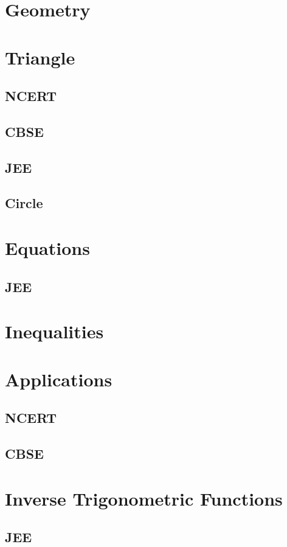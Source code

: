 \documentclass[journal]{IEEEtran}
\begin{document}
\newpage


\tableofcontents

\newpage
\onecolumn


\renewcommand{\thetable}{\theenumi}

\section{Geometry}

\section{Triangle}
\subsection{NCERT}

\subsection{CBSE}

\subsection{JEE}
 
\subsection{Circle}

\section{Equations}
\subsection{JEE}
 
\section{Inequalities}

\section{Applications}
\subsection{NCERT}

\subsection{CBSE}

\section{Inverse Trigonometric Functions}
\subsection{JEE}
 
%
 
\end{document}
